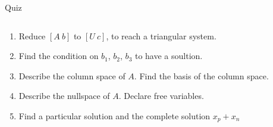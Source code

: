 \documentclass[aspectratio=169]{beamer}
\begin{document}
\begin{frame}[t]{Quiz}
\begin{columns}[T,onlytextwidth]
\begin{column}{0.7\textwidth}
\begin{enumerate}
            \item Reduce $[A\ b]$ to $[U\ c]$, to reach a triangular system.
            \item Find the condition on $b_1$, $b_2$, $b_3$ to have a soultion.
            \item Describe the column space of $A$. Find the basis of the column space.
            \item Describe the nullspace of $A$. Declare free variables.
            \item Find a particular solution and the complete solution $x_p + x_n$
        \end{enumerate}
    \end{column}
\end{columns}
\end{frame}
\end{document}
